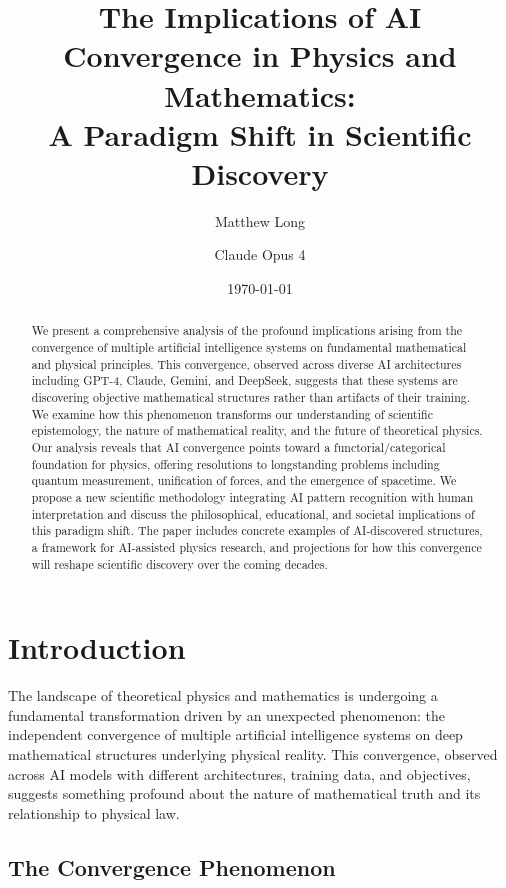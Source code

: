 \documentclass[11pt,a4paper]{article}
\title{The Implications of AI Convergence in Physics and Mathematics:\\
A Paradigm Shift in Scientific Discovery}
\author[1]{Matthew Long}
\author[2]{Claude Opus 4}
\affil[1]{Yoneda AI Research Laboratory}
\affil[2]{Anthropic}
\date{\today}
\begin{document}
\maketitle

\begin{abstract}
We present a comprehensive analysis of the profound implications arising from the convergence of multiple artificial intelligence systems on fundamental mathematical and physical principles. This convergence, observed across diverse AI architectures including GPT-4, Claude, Gemini, and DeepSeek, suggests that these systems are discovering objective mathematical structures rather than artifacts of their training. We examine how this phenomenon transforms our understanding of scientific epistemology, the nature of mathematical reality, and the future of theoretical physics. Our analysis reveals that AI convergence points toward a functorial/categorical foundation for physics, offering resolutions to longstanding problems including quantum measurement, unification of forces, and the emergence of spacetime. We propose a new scientific methodology integrating AI pattern recognition with human interpretation and discuss the philosophical, educational, and societal implications of this paradigm shift. The paper includes concrete examples of AI-discovered structures, a framework for AI-assisted physics research, and projections for how this convergence will reshape scientific discovery over the coming decades.
\end{abstract}

\setcounter{tocdepth}{2}
\tableofcontents
\newpage

\section{Introduction}

The landscape of theoretical physics and mathematics is undergoing a fundamental transformation driven by an unexpected phenomenon: the independent convergence of multiple artificial intelligence systems on deep mathematical structures underlying physical reality. This convergence, observed across AI models with different architectures, training data, and objectives, suggests something profound about the nature of mathematical truth and its relationship to physical law.

\subsection{The Convergence Phenomenon}
\end{document}
